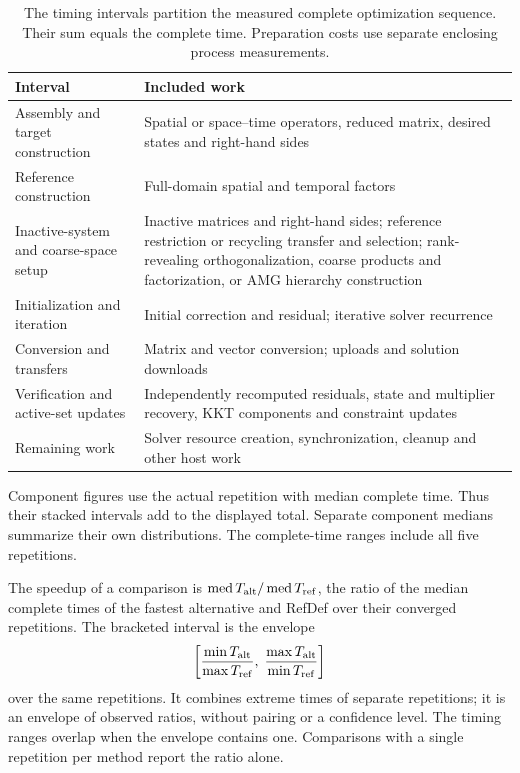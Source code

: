 \begin{table}[pos=H]
\centering\small
\caption{The timing intervals partition the measured complete
optimization sequence. Their sum equals the complete time.
Preparation costs use separate enclosing process measurements.}
\label{si:tab_timing_definitions}
\begin{tabularx}{\textwidth}{@{}p{}X@{}}
\toprule
Interval & Included work \\
\midrule
Assembly and target construction &
Spatial or space--time operators, reduced matrix, desired states
and right-hand sides \\
Reference construction &
Full-domain spatial and temporal factors \\
Inactive-system and coarse-space setup &
Inactive matrices and right-hand sides; reference restriction or
recycling transfer and selection; rank-revealing orthogonalization,
coarse products and factorization, or AMG hierarchy construction \\
Initialization and iteration &
Initial correction and residual; iterative solver recurrence \\
Conversion and transfers &
Matrix and vector conversion; uploads and solution downloads \\
Verification and active-set updates &
Independently recomputed residuals, state and multiplier recovery,
KKT components and constraint updates \\
Remaining work &
Solver resource creation, synchronization, cleanup and other host work \\
\bottomrule
\end{tabularx}
\end{table}

Component figures use the actual repetition with median complete
time. Thus their stacked intervals add to the displayed total.
Separate component medians summarize their own distributions.
The complete-time ranges include all five repetitions.

The speedup of a comparison is $\operatorname{med}T_{\rm alt}/\operatorname{med}T_{\rm ref}$,
the ratio of the median complete times of the fastest alternative and RefDef over their converged repetitions. The bracketed interval is the envelope
\[
 \left[\frac{\min T_{\rm alt}}{\max T_{\rm ref}},\;
        \frac{\max T_{\rm alt}}{\min T_{\rm ref}}\right]
\]
over the same repetitions. It combines extreme times of separate repetitions; it is
an envelope of observed ratios, without pairing or a confidence level. The timing
ranges overlap when the envelope contains one. Comparisons with a single repetition per method
report the ratio alone.

